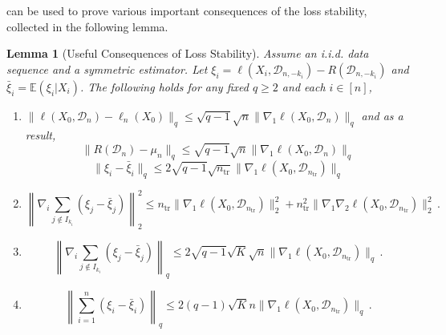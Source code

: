 \documentclass[11pt]{article}
\theoremstyle{plain}
\newtheorem{lemma}[theorem]{Lemma}
\newcommand{\tr}{{\mathrm{tr}}}
\newcommand{\D}{{\mathcal{D}}}
\begin{document}
 can be used to prove various important consequences of the loss stability, collected in the following lemma.
\begin{lemma}[Useful Consequences of Loss Stability]\label{lem:4.4-useful-fact-loss-stab}
Assume an i.i.d. data sequence and a symmetric estimator. Let $\xi_i=\ell(X_i,\D_{n,-k_i})-R(\D_{n,-k_i})$ and $\bar\xi_i=\mathbb E(\xi_i|X_i)$.  The following holds for any fixed $q\ge 2$ and each $i\in[n]$,
\begin{enumerate}
\item
$\|\ell(X_0,\D_n)-\ell_n(X_0)\|_q\le \sqrt{q-1}\sqrt{n}\|\nabla_1\ell(X_0,\D_n)\|_q$ and as a result,
$$
\|R(\D_n)-\mu_n\|_q\le \sqrt{q-1}\sqrt{n}\|\nabla_1\ell(X_0,\D_n)\|_q
$$
$$
\|\xi_i-\bar\xi_i\|_q\le 2\sqrt{q-1}\sqrt{n_\tr}\|\nabla_1\ell(X_0,\D_{n_\tr})\|_q
$$
    \item
    $$
   \left\|\nabla_i\sum_{j\notin I_{k_i}}(\xi_j-\bar\xi_j)\right\|_2^2
   \le n_\tr\|\nabla_1\ell(X_0,\D_{n_\tr})\|_2^2+n_{\tr}^2\|\nabla_1\nabla_2\ell(X_0,\D_{n_\tr})\|_2^2\,.
    $$
    \item
    $$
    \left\|\nabla_i\sum_{j\notin I_{k_i}}(\xi_j-\bar\xi_j)\right\|_q\le
    2\sqrt{q-1}\sqrt{K}\sqrt{n}\|\nabla_1\ell(X_0,\D_{n_\tr})\|_q\,.
    $$
    \item 
    $$
    \left\|\sum_{i=1}^n(\xi_i-\bar\xi_i)\right\|_q \le 2(q-1)\sqrt{K}n\|\nabla_1\ell(X_0,\D_{n_\tr})\|_q\,.
    $$
\end{enumerate}
\end{lemma}
\end{document}
